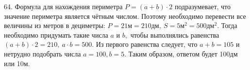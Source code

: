 64. Формула для нахождения периметра $P=(a+b)\cdot2$ подразумевает, что значение периметра является чётным числом. Поэтому необходимо перевести все величины из метров в дециметры: $P=21\text{м}=210\text{дм},\ S=5\text{м}^2=500\text{дм}^2.$ Тогда необходимо придумать такие числа $a$ и $b,$ чтобы выполнялись равенства $(a+b)\cdot2=210,\ a\cdot b=500.$ Из первого равенства следует, что $a+b=105$ и нетрудно подобрать числа $a=100, b=5.$ Таким образом, ответом будет 100дм или 10м.\\
